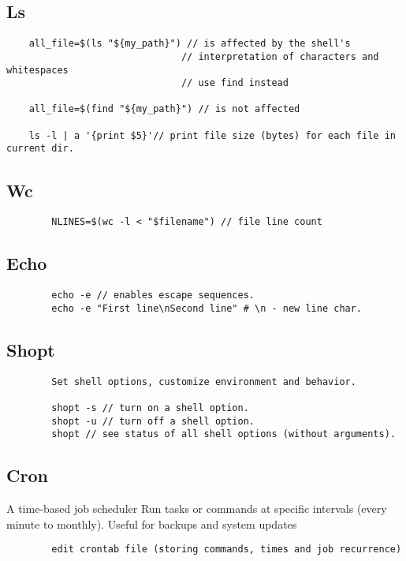     \subsection{Ls}
    \begin{verbatim}
    all_file=$(ls "${my_path}") // is affected by the shell's
                               // interpretation of characters and whitespaces
                               // use find instead 

    all_file=$(find "${my_path}") // is not affected

    ls -l | a '{print $5}'// print file size (bytes) for each file in current dir.
    \end{verbatim}
    \subsection{Wc}
    \begin{verbatim}
        NLINES=$(wc -l < "$filename") // file line count
    \end{verbatim}
    \subsection{Echo}
    \begin{verbatim}
        echo -e // enables escape sequences.
        echo -e "First line\nSecond line" # \n - new line char.
    \end{verbatim}
    \subsection{Shopt}

    \begin{verbatim}
        Set shell options, customize environment and behavior.

        shopt -s // turn on a shell option.
        shopt -u // turn off a shell option.
        shopt // see status of all shell options (without arguments).
    \end{verbatim}

    \subsection{Cron}

        A time-based job scheduler 
        Run tasks or commands at specific intervals (every minute to monthly). 
        Useful for backups and system updates 
    \begin{verbatim}
        edit crontab file (storing commands, times and job recurrence)
    \end{verbatim}

